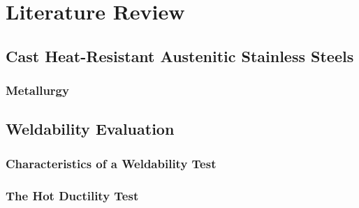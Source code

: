 \chapter{Literature Review} \label{ch:literature-review}

\section{Cast Heat-Resistant Austenitic Stainless Steels}

\subsection{Metallurgy}


\section{Weldability Evaluation} \label{sec:weldability-evaluation}

\subsection{Characteristics of a Weldability Test}

\subsection{The Hot Ductility Test}

